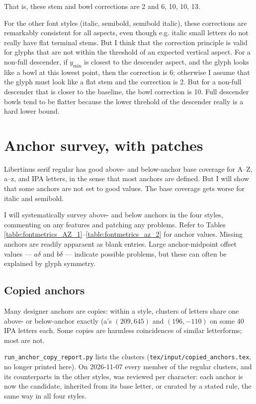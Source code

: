 \documentclass[landscape]{article}
\begin{document}
That is, these stem and bowl corrections are 2 and 6, 10, 10, 13.

For the other font styles (italic, semibold, semibold italic), these corrections are remarkably consistent for all aspects,
even though e.g. italic small letters do not really have flat terminal stems.
But I think that the correction principle is valid for glyphs that are not within the threshold of an expected vertical aspect.
For a non-full descender, if $y_\mathrm{min}$ is closest to the descender aspect, and the glyph looks like a bowl at this lowest point, 
then the correction is 6; otherwise I assume that the glyph must look like a flat stem and the correction is 2.
But for a non-full descender that is closer to the baseline, the bowl correction is 10.
Full descender bowls tend to be flatter because the lower threhold of the descender really is a hard lower bound.


\newpage
\section*{Anchor survey, with patches}

Libertinus serif regular has good above- and below-anchor base coverage for A--Z, a--z, and IPA letters,
in the sense that most anchors are defined. 
But I will show that some anchors are not set to good values.
The base coverage gets worse for italic and semibold.

I will systematically survey above- and below anchors in the four styles, 
commenting on any features and patching any problems. 
Refer to Tables \ref{table:fontmetrics_AZ_1}--\ref{table:fontmetrics_az_2} for anchor values.
Missing anchors are readily apparaent as blank entries.
Large anchor-midpoint offset values --- $a\delta$ and $b\delta$ --- indicate possible problems, 
but these can often be explained by glyph symmetry.

\subsection*{Copied anchors}
Many designer anchors are copies: within a style, clusters of letters share one above- or below-anchor exactly
(a's $(209, 645)$ and $(196, -110)$ on some 40 IPA letters each.
Some copies are harmless coincidences of similar letterforms; most are not.

\verb|run_anchor_copy_report.py| lists the clusters (\verb|tex/input/copied_anchors.tex|, no longer printed here).
On 2026-11-07 every member of the regular clusters, and its counterparts in the other styles, was reviewed per character:
each anchor is now the candidate, inherited from its base letter, or curated by a stated rule, the same way in all four styles.
\end{document}
